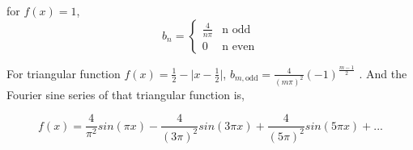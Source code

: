 \documentclass{article}
\theoremstyle{mytheoremstyle}
\theoremstyle{mytheoremstyle}
\theoremstyle{myproblemstyle}
\begin{document}
    \noindent for $ f(x) = 1 $,
    \begin{equation}
	b_n = 
    	\begin{cases}
		\frac{4}{n \pi} & \text{n odd} \\
		0 & \text{n even}
    	\end{cases}
    	\label{eq:6}
    \end{equation}

    \pagebreak

    \noindent For triangular function $ f(x) = \frac{1}{2} - \lvert x - \frac{1}{2} \rvert $, $ b_{m, \text{odd}} = \frac{4}{(m \pi)^2} (-1)^{\frac{m-1}{2}} $ . And the Fourier sine series of that triangular function is,

    \begin{equation}
	    f(x) = \frac{4}{\pi^2} sin(\pi x) - \frac{4}{(3 \pi)^2} sin(3 \pi x) + \frac{4}{(5 \pi)^2} sin(5 \pi x) + ...
    	\label{eq:7}
    \end{equation}
\end{document}
